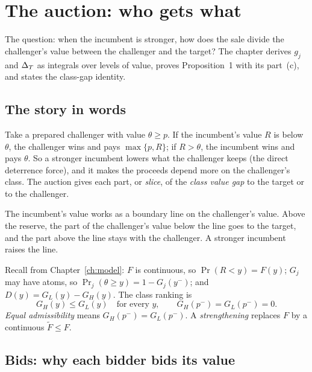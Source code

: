 \chapter{The auction: who gets what}\label{ch:auction}

\begin{chapterplan}
The question: when the incumbent is stronger, how does the sale divide the challenger's value between the challenger and the target?
The chapter derives \(g_j\) and \(\Delta_T\) as integrals over levels of value, proves Proposition~1 with its part~(c), and states the class-gap identity.
\end{chapterplan}

\section{The story in words}\label{sec:auction-story}

Take a prepared challenger with value \(\theta\ge p\). If the incumbent's value \(R\) is below \(\theta\), the challenger wins and pays \(\max\{p,R\}\); if \(R>\theta\), the incumbent wins and pays \(\theta\).
So a stronger incumbent lowers what the challenger keeps (the direct deterrence force), and it makes the proceeds depend more on the challenger's class.
The auction gives each part, or \emph{slice}, of the \emph{class value gap} to the target or to the challenger.

\begin{keyidea}
The incumbent's value works as a boundary line on the challenger's value. Above the reserve, the part of the challenger's value below the line goes to the target, and the part above the line stays with the challenger. A stronger incumbent raises the line.
\end{keyidea}

Recall from Chapter~\ref{ch:model}: \(F\) is continuous, so \(\Pr(R<y)=F(y)\); \(G_j\) may have atoms, so \(\Pr_j(\theta\ge y)=1-G_j(y^-)\); and \(D(y)=G_L(y)-G_H(y)\). The class ranking is
\begin{equation}\label{eq:auction-ranking}
G_H(y)\le G_L(y)\quad\text{for every }y,\qquad G_H(p^-)=G_L(p^-)=0.
\end{equation}
\emph{Equal admissibility} means \(G_H(p^-)=G_L(p^-)\). A \emph{strengthening} replaces \(F\) by a continuous \(\tilde F\le F\).

\section{Bids: why each bidder bids its value}\label{sec:auction-bids}

